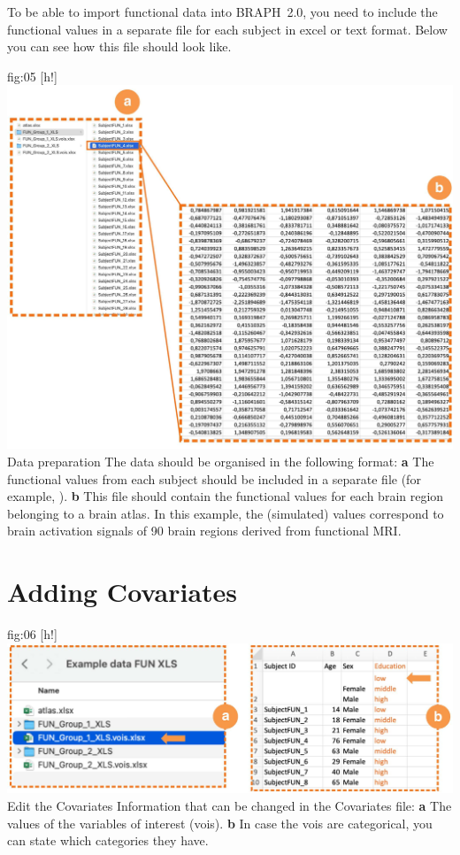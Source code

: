 \documentclass[justified]{tufte-handout}
\begin{document}
To be able to import functional data into BRAPH~2.0, you need to include the functional values in a separate file for each subject in excel or text format. Below you can see how this file should look like.

	{fig:05}
	{
	[h!]
	\includegraphics{fig05.jpg}
	}
	{Data preparation}
	{
	The data should be organised in the following format:
	{\bf a} The functional values from each subject should be included in a separate file (for example, ). 
	{\bf b} This file should contain the functional values for each brain region belonging to a brain atlas. In this example, the (simulated) values correspond to brain activation signals of 90 brain regions derived from functional MRI.
	} 

\section{Adding Covariates}

	{fig:06}
	{
	[h!]
	\includegraphics{fig06.jpg}
	}
	{Edit the Covariates}
	{
	Information that can be changed in the Covariates file: 
	{\bf a} The values of the variables of interest (vois).
	{\bf b} In case the vois are categorical, you can state which categories they have.
	}
	
\end{document}
